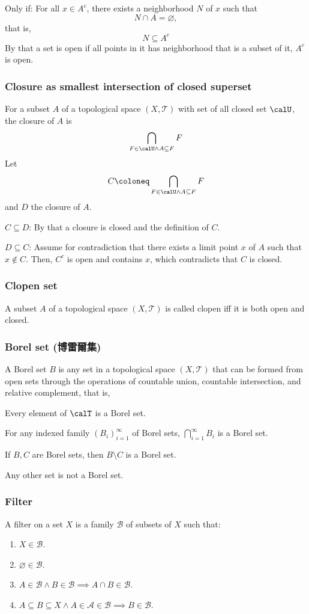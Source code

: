 \documentclass[a4paper,12pt]{article}
\begin{document}
Only if: For all $x\in A^c$, there exists a neighborhood $N$ of $x$ such that
\[N\cap A=\varnothing,\]
that is,
\[N\subseteq A^c\]
By that a set is open if all points in it has neighborhood that is a subset of it, $A^c$ is open.
\epr
\subsubsection{Closure as smallest intersection of closed superset}
For a subset $A$ of a topological space $(X,\mathcal{T})$ with set of all closed set $\calU$, the closure of $A$ is
\[\bigcap_{F\in\calU\land A\subseteq F}F\]
\bpr
Let
\[C\coloneq\bigcap_{F\in\calU\land A\subseteq F}F\]
and $D$ the closure of $A$.

$C\subseteq D$: By that a closure is closed and the definition of $C$.

$D\subseteq C$: Assume for contradiction that there exists a limit point $x$ of $A$ such that $x\notin C$. Then, $C^c$ is open and contains $x$, which contradicts that $C$ is closed.
\epr
\subsubsection{Clopen set}
A subset $A$ of a topological space $(X,\mathcal{T})$ is called clopen iff it is both open and closed.
\subsubsection{Borel set (博雷爾集)}
A Borel set $B$ is any set in a topological space $(X,\mathcal{T})$ that can be formed from open sets through the operations of countable union, countable intersection, and relative complement, that is,
\ben
\item Every element of $\calT$ is a Borel set.
\item For any indexed family $(B_i)_{i=1}^{\infty}$ of Borel sets, $\bigcap_{i=1}^{\infty}B_i$ is a Borel set.
\item If $B,C$ are Borel sets, then $B\setminus C$ is a Borel set.
\item Any other set is not a Borel set.
\een
\subsubsection{Filter}
A filter on a set $X$ is a family $\mathcal{B}$ of subsets of $X$ such that: 
\begin{enumerate}
\item $X\in\mathcal{B}$.
\item $\varnothing\in\mathcal{B}$.
\item $A\in\mathcal{B}\land B\in\mathcal{B}\implies A\cap B\in\mathcal{B}$.
\item $A\subseteq B\subseteq X\land A\in\mathcal{A}\in\mathcal{B}\implies B\in\mathcal{B}$.
\end{enumerate}
\end{document}
